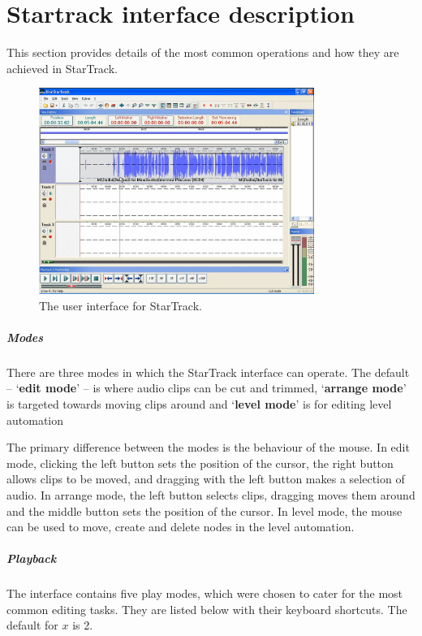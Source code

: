 \chapter{Startrack interface description}\label{app:startrack}
This section provides details of the most common operations and how they are
achieved in StarTrack.

\begin{figure}[ht]
\centering
\includegraphics[width=0.8\textwidth]{figs/startrack.png}
\caption{The user interface for StarTrack.}
\label{fig:startrack}
\end{figure}

\paragraph{Modes}
There are three modes in which the StarTrack interface can operate. The default
-- `\textbf{edit mode}' -- is where audio clips can be cut and trimmed,
`\textbf{arrange mode}' is targeted towards moving clips around and
`\textbf{level mode}' is for editing level automation

The primary difference between the modes is the behaviour of the mouse. In
edit mode, clicking the left button sets the position of the cursor, the right
button allows clips to be moved, and dragging with the left button makes a
selection of audio. In arrange mode, the left button selects clips, dragging
moves them around and the middle button sets the position of the cursor. In
level mode, the mouse can be used to move, create and delete nodes in the level
automation.

\paragraph{Playback}
The interface contains five play modes, which were chosen to cater for the most
common editing tasks. They are listed below with their keyboard shortcuts. The
default for $x$ is 2.

